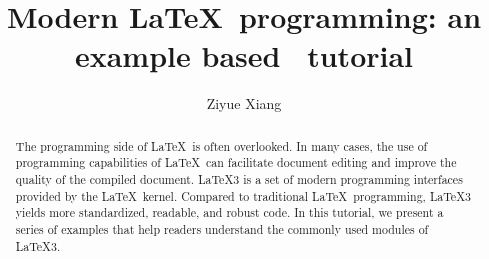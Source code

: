 \documentclass{ltugboat}
\title{Modern \LaTeX~programming: an example based \liii~tutorial}
\author{Ziyue Xiang}
\begin{document}
\begin{abstract}
The programming side of \LaTeX\ is often overlooked.
In many cases, the use of programming capabilities of \LaTeX\ can facilitate document editing and improve the quality of the compiled document.
\LaTeX3 is a set of modern programming interfaces provided by the \LaTeX\ kernel.
Compared to traditional \LaTeX\ programming, \LaTeX3 yields more standardized, readable, and robust code.
In this tutorial, we present a series of examples that help readers understand the commonly used modules of \LaTeX3.
\end{abstract}
\maketitle
\tableofcontents
\ListOfCodeExample
\end{document}
